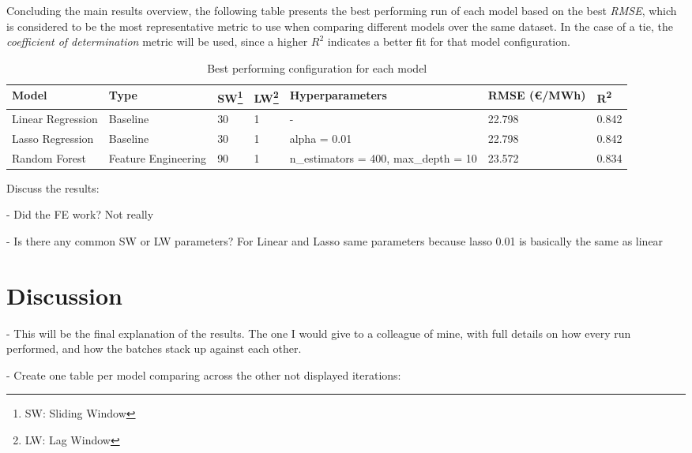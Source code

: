 \documentclass[12pt]{report} %
\begin{document}
Concluding the main results overview, the following table presents the best performing run of each model based on the best \textit{RMSE}, which is considered to be the most representative metric to use when comparing different models over the same dataset. In the case of a tie, the \textit{coefficient of determination} metric will be used, since a higher $R^2$ indicates a better fit for that model configuration.
\begin{table}[H]
	\caption{Best performing configuration for each model}
	\centering
	\begin{tabular}{|P{2cm}|P{2.1cm}|P{0.7cm}|P{0.7cm}|P{3.6cm}|P{1.8cm}|P{0.9cm}|}
		\hline
		\textbf{Model} & \textbf{Type} & \textbf{SW\footnote{SW: Sliding Window}} & \textbf{LW\footnote{LW: Lag Window}} & \textbf{Hyperparameters} & \textbf{RMSE (€/MWh)} & \textbf{R\textsuperscript{2}} \\
		\hline
		Linear Regression & Baseline & 30 & 1 & - & 22.798 & 0.842 \\
		\hline
		Lasso Regression & Baseline & 30 & 1 & alpha = 0.01 & 22.798 & 0.842 \\
		\hline
		Random Forest & Feature Engineering & 90 & 1 & n\_estimators = 400, max\_depth = 10 & 23.572 & 0.834 \\
		\hline
	\end{tabular}
\end{table}

Discuss the results:

- Did the FE work? Not really

- Is there any common SW or LW parameters? For Linear and Lasso same parameters because lasso 0.01 is basically the same as linear


\section{Discussion} %
- This will be the final explanation of the results. The one I would give to a colleague of mine, with full details on how every run performed, and how the batches stack up against each other.

- Create one table per model comparing across the other not displayed iterations:
\end{document}
